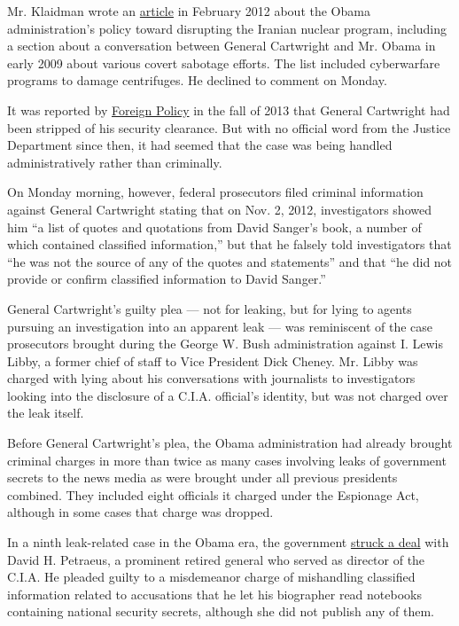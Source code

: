 Mr. Klaidman wrote an
\href{http://www.newsweek.com/obamas-dangerous-game-iran-65711}{article}
in February 2012 about the Obama administration's policy toward
disrupting the Iranian nuclear program, including a section about a
conversation between General Cartwright and Mr. Obama in early 2009
about various covert sabotage efforts. The list included cyberwarfare
programs to damage centrifuges. He declined to comment on Monday.

It was reported by
\href{http://foreignpolicy.com/2013/09/24/obamas-favorite-general-stripped-of-his-security-clearance/}{Foreign
Policy} in the fall of 2013 that General Cartwright had been stripped of
his security clearance. But with no official word from the Justice
Department since then, it had seemed that the case was being handled
administratively rather than criminally.

On Monday morning, however, federal prosecutors filed criminal
information against General Cartwright stating that on Nov. 2, 2012,
investigators showed him ``a list of quotes and quotations from David
Sanger's book, a number of which contained classified information,'' but
that he falsely told investigators that ``he was not the source of any
of the quotes and statements'' and that ``he did not provide or confirm
classified information to David Sanger.''

General Cartwright's guilty plea --- not for leaking, but for lying to
agents pursuing an investigation into an apparent leak --- was
reminiscent of the case prosecutors brought during the George W. Bush
administration against I. Lewis Libby, a former chief of staff to Vice
President Dick Cheney. Mr. Libby was charged with lying about his
conversations with journalists to investigators looking into the
disclosure of a C.I.A. official's identity, but was not charged over the
leak itself.

Before General Cartwright's plea, the Obama administration had already
brought criminal charges in more than twice as many cases involving
leaks of government secrets to the news media as were brought under all
previous presidents combined. They included eight officials it charged
under the Espionage Act, although in some cases that charge was dropped.

In a ninth leak-related case in the Obama era, the government
\href{http://www.nytimes.com/2015/03/04/us/petraeus-plea-deal-over-giving-classified-data-to-lover.html}{struck
a deal} with David H. Petraeus, a prominent retired general who served
as director of the C.I.A. He pleaded guilty to a misdemeanor charge of
mishandling classified information related to accusations that he let
his biographer read notebooks containing national security secrets,
although she did not publish any of them.

